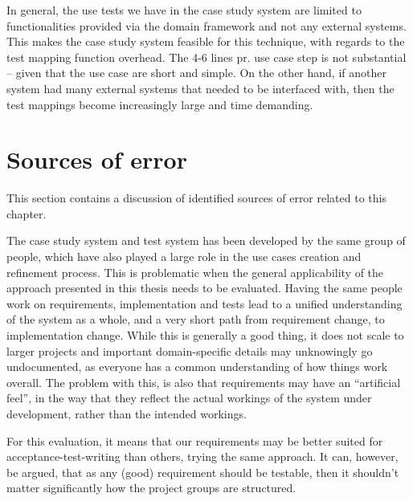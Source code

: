 \noindent In general, the use tests we have in the case study system are limited to functionalities provided via the domain framework and not any external systems. This makes the case study system feasible for this technique, with regards to the test mapping function overhead. The 4-6 lines pr. use case step is not substantial -- given that the use case are short and simple. On the other hand, if another system had many external systems that needed to be interfaced with, then the test mappings become increasingly large and time demanding.

\section{Sources of error}
This section contains a discussion of identified sources of error related to this chapter.\medskip

\noindent The case study system and test system has been developed by the same group of people, which have also played a large role in the use cases creation and refinement process. This is problematic when the general applicability of the approach presented in this thesis needs to be evaluated. Having the same people work on requirements, implementation and tests lead to a unified understanding of the system as a whole, and a very short path from requirement change, to implementation change. While this is generally a good thing, it does not scale to larger projects and important domain-specific details may unknowingly go undocumented, as everyone has a common understanding of how things work overall. The problem with this, is also that requirements may have an ``artificial feel'', in the way that they reflect the actual workings of the system under development, rather than the intended workings.\medskip

\noindent For this evaluation, it means that our requirements may be better suited for acceptance-test-writing than others, trying the same approach. It can, however, be argued, that as any (good) requirement should be testable\cite{hull2010requirements}, then it shouldn't matter significantly how the project groups are structured.